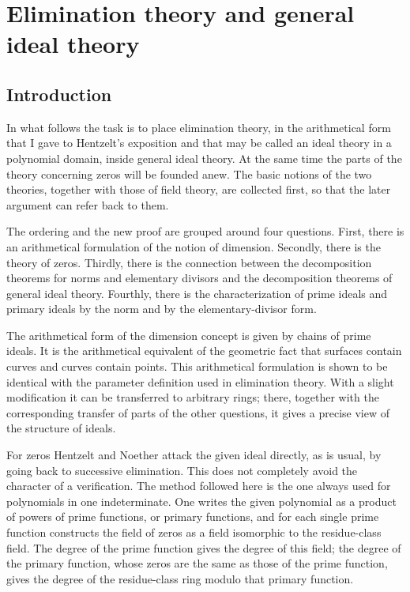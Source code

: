 \documentclass[12pt]{article}
\begin{document}
\newpage

\section{Elimination theory and general ideal theory}

\subsection*{Introduction}

In what follows the task is to place elimination theory, in the arithmetical form that I gave to Hentzelt's exposition and that may be called an ideal theory in a polynomial domain, inside general ideal theory. At the same time the parts of the theory concerning zeros will be founded anew. The basic notions of the two theories, together with those of field theory, are collected first, so that the later argument can refer back to them.

The ordering and the new proof are grouped around four questions. First, there is an arithmetical formulation of the notion of dimension. Secondly, there is the theory of zeros. Thirdly, there is the connection between the decomposition theorems for norms and elementary divisors and the decomposition theorems of general ideal theory. Fourthly, there is the characterization of prime ideals and primary ideals by the norm and by the elementary-divisor form.

The arithmetical form of the dimension concept is given by chains of prime ideals. It is the arithmetical equivalent of the geometric fact that surfaces contain curves and curves contain points. This arithmetical formulation is shown to be identical with the parameter definition used in elimination theory. With a slight modification it can be transferred to arbitrary rings; there, together with the corresponding transfer of parts of the other questions, it gives a precise view of the structure of ideals.

For zeros Hentzelt and Noether attack the given ideal directly, as is usual, by going back to successive elimination. This does not completely avoid the character of a verification. The method followed here is the one always used for polynomials in one indeterminate. One writes the given polynomial as a product of powers of prime functions, or primary functions, and for each single prime function constructs the field of zeros as a field isomorphic to the residue-class field. The degree of the prime function gives the degree of this field; the degree of the primary function, whose zeros are the same as those of the prime function, gives the degree of the residue-class ring modulo that primary function.
\end{document}
